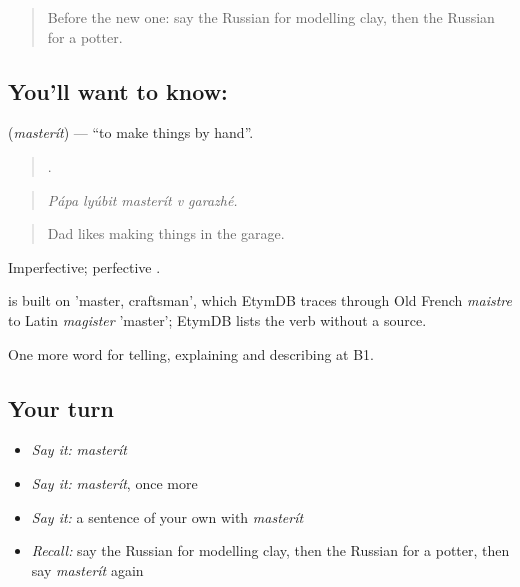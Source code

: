 \begin{quote}
Before the new one: say the Russian for modelling clay, then the Russian for a potter.
\end{quote}

\subsection*{You'll want to know: }
\textbf{} (\emph{masterít}) — \textquotedblleft{}to make things by hand\textquotedblright{}.

\begin{quote}
    .
\end{quote}

\begin{quote}
\emph{Pápa lyúbit masterít v garazhé.}
\end{quote}

\begin{quote}
Dad likes making things in the garage.
\end{quote}

Imperfective; perfective .

\begin{cousinweb}
\emph{} is built on \emph{} 'master, craftsman', which EtymDB traces through Old French \emph{maistre} to Latin \emph{magister} 'master'; EtymDB lists the verb without a source.
\end{cousinweb}

\begin{grammarlens}[title={What you've built}]
One more word for telling, explaining and describing at B1.
\end{grammarlens}

\subsection*{Your turn}
\begin{itemize}
\raggedright
  \item \emph{Say it:} \emph{masterít}
  \item \emph{Say it:} \emph{masterít}, once more
  \item \emph{Say it:} a sentence of your own with \emph{masterít}
  \item \emph{Recall:} say the Russian for modelling clay, then the Russian for a potter, then say \emph{masterít} again
\end{itemize}

